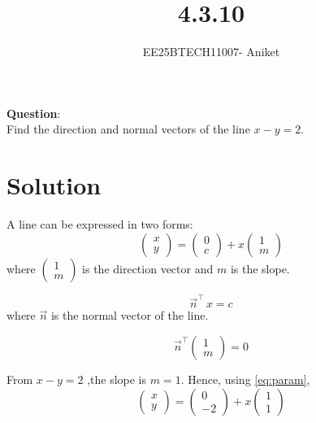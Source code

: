 \documentclass[journal]{IEEEtran}
\begin{document}

\vspace{3cm}

\title{4.3.10}
\author{EE25BTECH11007- Aniket}
\maketitle
{\let\newpage\relax\maketitle}

\setlength{\intextsep}{10pt}
\textbf{Question}:\\
Find the direction and normal vectors of the line $x - y = 2$.

\section*{Solution}
A line can be expressed in two forms:
\begin{equation}
\begin{pmatrix} x \\ y \end{pmatrix}
=
\begin{pmatrix} 0 \\ c \end{pmatrix}
+ x
\begin{pmatrix} 1 \\ m \end{pmatrix}
\label{eq:param}
\end{equation}
where $\begin{pmatrix} 1 \\ m \end{pmatrix}$ is the direction vector and $m$ is the slope.

\begin{equation}
\vec{n}^{\top}\,x = c
\label{eq:normal}
\end{equation}
where $\vec{n}$ is the normal vector of the line.

\begin{equation}
\vec{n}^{\top}
\begin{pmatrix} 1 \\ m \end{pmatrix}
= 0
\label{eq:orth}
\end{equation}

From $x - y = 2$ ,the slope is $m=1$. Hence, using \eqref{eq:param},
\begin{equation}
\begin{pmatrix} x \\ y \end{pmatrix}
=
\begin{pmatrix} 0 \\ -2 \end{pmatrix}
+ x
\begin{pmatrix} 1 \\ 1 \end{pmatrix}
\label{eq:param-inst}
\end{equation}
\end{document}
